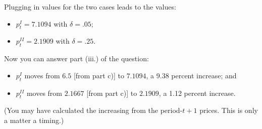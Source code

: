 \documentclass[12pt]{pracjourn_rwr}
\theoremstyle{definition}
\theoremstyle{remark}
\begin{document}
Plugging in values for the two cases leads to the values:
\begin{itemize}
\item $p^{I}_{t} = 7.1094$ with $\delta = .05$;
\item $p^{II}_{t} = 2.1909$ with $\delta = .25$.
\end{itemize}

Now you can answer part (iii.) of the question:
\begin{itemize}
\item $p_{t}^{I}$ moves from $6.5$ [from part c)] to $7.1094$, a 9.38 percent increase; and
\item $p_{t}^{II}$ moves from $2.1667$ [from part c)] to $2.1909$, a 1.12 percent increase.
\end{itemize}

(You may have calculated the increasing from the period-$t+1$ prices.
This is only a matter a timing.)

% 
% 
\end{document}
